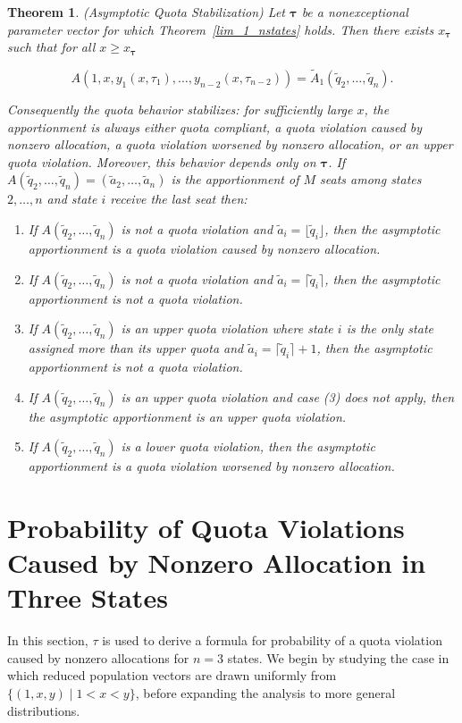 \documentclass[11pt]{article}
\newtheorem{theorem}{Theorem}[section]
\theoremstyle{definition}
\theoremstyle{definition}
\begin{document}
\begin{theorem}\label{quota_stabilization_n}
(Asymptotic Quota Stabilization) Let $\bm\tau$ be a nonexceptional parameter vector for which Theorem~\ref{lim_1_nstates} holds. Then there exists $x_{\bm{\tau}}$ such that for all $x\ge x_{\bm\tau}$

$$
A(1,x,y_1(x,\tau_1),\dots,y_{n-2}(x,\tau_{n-2}))
= \tilde A_1(\tilde q_2,\dots,\tilde q_n).
$$

Consequently the quota behavior stabilizes: for sufficiently large $x$, the apportionment is always either quota compliant, a quota violation caused by nonzero allocation, a quota violation worsened by nonzero allocation, or an upper quota violation. Moreover, this behavior depends only on $\bm{\tau}$. If $A(\tilde q_2,\dots,\tilde q_n)=(\tilde a_2,\dots,\tilde a_n)$ is the apportionment of $M$ seats among states $2,\dots,n$ and state $i$ receive the last seat then:
\begin{enumerate}
\item If $A(\tilde q_2,\dots,\tilde q_n)$ is not a quota violation and $\tilde a_i=\lfloor\tilde q_i\rfloor$, then the asymptotic apportionment is a quota violation caused by nonzero allocation.
\item If $A(\tilde q_2,\dots,\tilde q_n)$ is not a quota violation and $\tilde a_i=\lceil\tilde q_i\rceil$, then the asymptotic apportionment is not a quota violation.
\item If $A(\tilde q_2,\dots,\tilde q_n)$ is an upper quota violation where state $i$ is the only state assigned more than its upper quota and $\tilde{a}_i = \lceil\tilde q_i\rceil +1$, then the asymptotic apportionment is not a quota violation.
\item If $A(\tilde q_2,\dots,\tilde q_n)$ is an upper quota violation and case (3) does not apply, then the asymptotic apportionment is an upper quota violation.
\item If $A(\tilde q_2,\dots,\tilde q_n)$ is a lower quota violation, then the asymptotic apportionment is a quota violation worsened by nonzero allocation.
\end{enumerate}
\end{theorem}


\section{Probability of Quota Violations Caused by Nonzero Allocation in Three States }
In this section, $\tau$ is used to derive a formula for probability of a quota violation caused by nonzero allocations for $n=3$ states. We begin by studying the case in which reduced population vectors are drawn uniformly from $\{(1,x,y) \mid 1<x<y \}$, before expanding the analysis to more general distributions.
\end{document}
